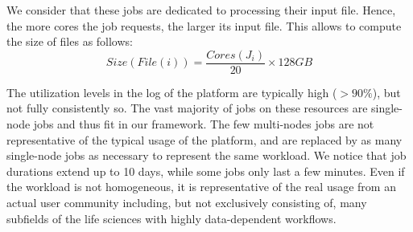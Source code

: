 \documentclass[conference,10pt]{IEEEtran}
\newcommand{\file}{\ensuremath{\mathit{File}}\xspace}
\newcommand{\size}{\ensuremath{\mathit{Size}}\xspace}
\newcommand{\core}{\mathit{Cores}\xspace}
\begin{document}
We consider that these jobs are dedicated to processing their input
file. Hence, the more cores the job requests, 
the larger its input file. This allows to compute the size of files as follows:
$$\size(\file(i)) =\frac{\core(J_i)}{20} \times 128GB$$

The utilization levels in the log of the platform are typically high ($>90\%$), but
not fully consistently so. The vast majority of jobs on these
resources are single-node jobs and thus fit in our framework.
The few multi-nodes jobs are not representative of the typical usage
of the platform, and are replaced by as many single-node jobs as necessary to represent the same workload.
We notice that job
durations extend up to 10 days, while some jobs only last a few
minutes. Even if the workload is not homogeneous, it is representative
of the real usage from an actual user community including, but not exclusively consisting of, many subfields of the life sciences with highly data-dependent workflows.
\end{document}
